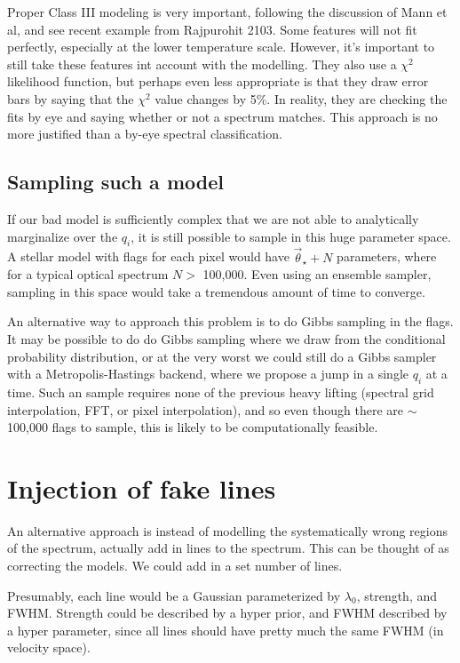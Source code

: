 \documentclass[preprint]{aastex} %
\newcommand{\vt}{\vec{\theta}}
\newcommand{\vstar}{\vt_{\star}}
\begin{document}
Proper Class III modeling is very important, following the discussion of \citep{mga13} Mann et al, and see recent example from Rajpurohit 2103. Some features will not fit perfectly, especially at the lower temperature scale. However, it's important to still take these features int account with the modelling. They also use a $\chi^2$ likelihood function, but perhaps even less appropriate is that they draw error bars by saying that the $\chi^2$ value changes by 5\%. In reality, they are checking the fits by eye and saying whether or not a spectrum matches. This approach is no more justified than a by-eye spectral classification.

\subsection{Sampling such a model}
If our bad model is sufficiently complex that we are not able to analytically marginalize over the $q_i$, it is still possible to sample in this huge parameter space. A stellar model with flags for each pixel would have $\vstar + N$ parameters, where for a typical optical spectrum $N >$ 100,000. Even using an ensemble sampler, sampling in this space would take a tremendous amount of time to converge. 

An alternative way to approach this problem is to do Gibbs sampling in the flags. It may be possible to do do Gibbs sampling where we draw from the conditional probability distribution, or at the very worst we could still do a Gibbs sampler with a Metropolis-Hastings backend, where we propose a jump in a single $q_i$ at a time. Such an sample requires none of the previous heavy lifting (spectral grid interpolation, FFT, or pixel interpolation), and so even though there are $\sim$ 100,000 flags to sample, this is likely to be computationally feasible.

\section{Injection of fake lines}

An alternative approach is instead of modelling the systematically wrong regions of the spectrum, actually add in lines to the spectrum. This can be thought of as correcting the models. We could add in a set number of lines.

Presumably, each line would be a Gaussian parameterized by $\lambda_0$, strength, and FWHM. Strength could be described by a hyper prior, and FWHM described by a hyper parameter, since all lines should have pretty much the same FWHM (in velocity space). 
\end{document}
